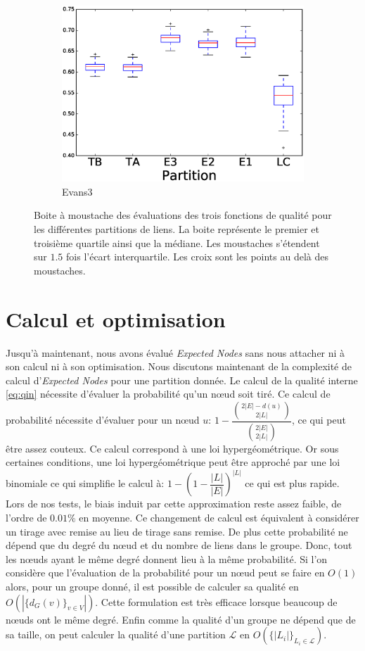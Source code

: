 \begin{figure}
\begin{subfigure}{0.31\textwidth}
		\includegraphics[width=\linewidth]{img/ExpectedNodes/LF/LFR1_Evans3_ALL.eps}
		\caption{\label{fig:LFE3}Evans3}		
	\end{subfigure}
	\caption{Boite à moustache des évaluations des trois fonctions de qualité pour les différentes partitions de liens. 
	La boite représente le premier et troisième quartile ainsi que la médiane.
	Les moustaches s'étendent sur $1.5$ fois l'écart interquartile. 
	Les croix sont les points au delà des moustaches.
	}
	\label{fig:LF}
\end{figure}


\section{Calcul et optimisation}
Jusqu'à maintenant, nous avons évalué \emph{Expected Nodes} sans nous attacher ni à son calcul ni à son optimisation.
Nous discutons maintenant de la complexité de calcul d'\emph{Expected Nodes} pour une partition donnée.
Le calcul de la qualité interne \ref{eq:qin} nécessite d'évaluer la probabilité qu'un n\oe ud soit tiré.
Ce calcul de probabilité nécessite d'évaluer pour un n\oe ud $u$: $1 - \dfrac{ \binom{2|E|-d(u)}{2|L|} }{ \binom{2|E|}{2|L|} }$, ce qui peut être assez couteux.
Ce calcul correspond à une loi hypergéométrique.
Or sous certaines conditions, une loi hypergéométrique peut être approché par une loi binomiale ce qui simplifie le calcul à: $1 - (1- \dfrac{|L|}{|E|})^{|L|}$ ce qui est plus rapide.
Lors de nos tests, le biais induit par cette approximation reste assez faible, de l'ordre de $0.01\%$ en moyenne.
Ce changement de calcul est équivalent à considérer un tirage avec remise au lieu de tirage sans remise.
De plus cette probabilité ne dépend que du degré du n\oe ud et du nombre de liens dans le groupe.
Donc, tout les n\oe uds ayant le même degré donnent lieu à la même probabilité.
Si l'on considère que l'évaluation de la probabilité pour un n\oe ud peut se faire en $O(1)$ alors, pour un groupe donné, il est possible de calculer sa qualité en $O(|\{d_G(v)\}_{v \in V}|)$.
Cette formulation est très efficace lorsque beaucoup de n\oe uds ont le même degré.
Enfin comme la qualité d'un groupe ne dépend que de sa taille, on peut calculer la qualité d'une partition $\mathcal{L}$ en $O(\{|L_i|\}_{L_i \in \mathcal{L}})$.

